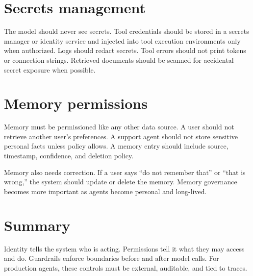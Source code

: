 \section{Secrets management}

The model should never see secrets. Tool credentials should be stored in a secrets manager or identity service and injected into tool execution environments only when authorized. Logs should redact secrets. Tool errors should not print tokens or connection strings. Retrieved documents should be scanned for accidental secret exposure when possible.

\section{Memory permissions}

Memory must be permissioned like any other data source. A user should not retrieve another user's preferences. A support agent should not store sensitive personal facts unless policy allows. A memory entry should include source, timestamp, confidence, and deletion policy.

Memory also needs correction. If a user says ``do not remember that'' or ``that is wrong,'' the system should update or delete the memory. Memory governance becomes more important as agents become personal and long-lived.

\section{Summary}

Identity tells the system who is acting. Permissions tell it what they may access and do. Guardrails enforce boundaries before and after model calls. For production agents, these controls must be external, auditable, and tied to traces.
